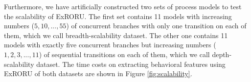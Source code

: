 \documentclass{llncs}
\begin{document}


Furthermore, we have artificially constructed two sets of process models to test the scalability of ExRORU. The first set contains 11 models with increasing numbers ($5,10,...,55$) of concurrent branches with only one transition on each of them, which we call breadth-scalability dataset. The other one contains 11 models with exactly five concurrent branches but increasing numbers ($1,2,3,...,11$) of sequential transitions on each of them, which we call depth-scalability dataset. The time costs on extracting behavioral features using ExRORU of both datasets are shown in Figure \ref{fig:scalability}.
\end{document}
